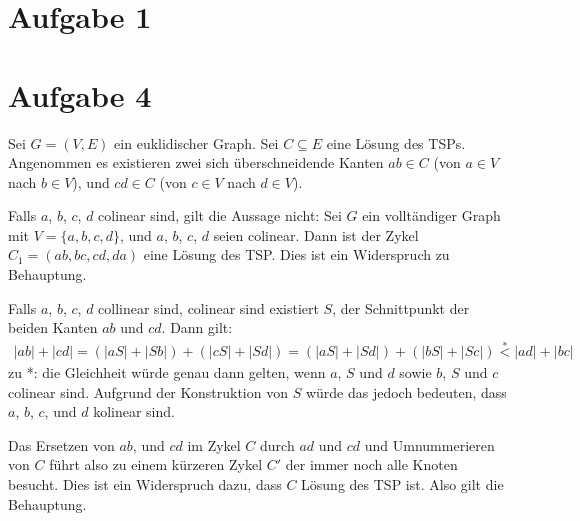 \documentclass[a4paper]{article}
\begin{document}
\section{Aufgabe 1}

\section{Aufgabe 4}
	Sei $G=(V,E)$ ein euklidischer Graph.
	Sei $C \subseteq E$ eine Lösung des TSPs.
	Angenommen es existieren zwei sich überschneidende Kanten $ab \in C$ (von $a \in V$ nach $b \in V$), und $cd \in C$ (von $c \in V$ nach $d \in V$). 
	
	Falls $a$, $b$, $c$, $d$ colinear sind, gilt die Aussage nicht:
	Sei $G$ ein volltändiger Graph mit $V = \{a,b,c,d\}$, und $a$, $b$, $c$, $d$ seien colinear. Dann ist der Zykel $C_1 = (ab,bc,cd,da)$ eine Lösung des TSP. Dies ist ein Widerspruch zu Behauptung.
	
	Falls $a$, $b$, $c$, $d$ collinear sind, colinear sind existiert $S$, der Schnittpunkt der beiden Kanten $ab$ und $cd$. Dann 	gilt:
	\begin{align*}
		|ab|+|cd| = (|aS| + |Sb|) + (|cS| + |Sd|) = (|aS| + |Sd|) + (|bS| + |Sc|) \stackrel*< |ad| + |bc|
	\end{align*}
	zu *: die Gleichheit würde genau dann gelten, wenn $a$, $S$ und $d$ sowie $b$, $S$ und $c$ colinear sind. Aufgrund der Konstruktion von $S$ würde das jedoch bedeuten, dass $a$, $b$, $c$, und $d$ kolinear sind. 
	
	Das Ersetzen von $ab$, und $cd$ im Zykel $C$ durch $ad$ und $cd$ und Umnummerieren von $C$ führt also zu einem kürzeren Zykel $C'$ der immer noch alle Knoten besucht. Dies ist ein Widerspruch dazu, dass $C$ Lösung des TSP ist. Also gilt die Behauptung.
\end{document}
